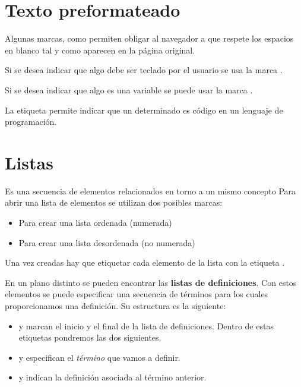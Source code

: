 \documentclass[letterpaper,10pt,spanish]{sphinxmanual}
\begin{document}
\section{Texto preformateado}
\label{tema2:texto-preformateado}
Algunas marcas, como  permiten obligar al navegador a que respete los espacios en blanco tal y como aparecen en la página original.

Si se desea indicar que algo debe ser teclado por el usuario se usa la marca .

Si se desea indicar que algo es una variable se puede usar la marca .

La etiqueta  permite indicar que un determinado es código en un lenguaje de programación.


\section{Listas}
\label{tema2:listas}
Es una secuencia de elementos relacionados en torno a un mismo concepto Para abrir una lista de elementos se utilizan dos posibles marcas:
\begin{itemize}
\item {} 
 Para crear una lista ordenada (numerada)

\item {} 
 Para crear una lista desordenada (no numerada)

\end{itemize}

Una vez creadas hay que etiquetar cada elemento de la lista con la etiqueta .

En un plano distinto se pueden encontrar las \textbf{listas de definiciones}. Con estos elementos se puede especificar una secuencia de términos para los cuales proporcionamos una definición. Su estructura es la siguiente:
\begin{itemize}
\item {} 
 y  marcan el inicio y el final de la lista de definiciones. Dentro de estas etiquetas pondremos las dos siguientes.

\item {} 
 y  especifican el \emph{término} que vamos a definir.

\item {} 
 y  indican la definición asociada al término anterior.

\end{itemize}
\end{document}
